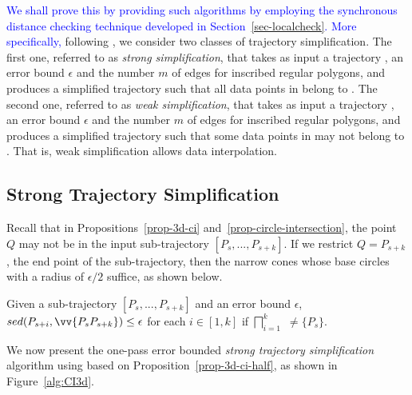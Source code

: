 \textcolor{blue}{We shall prove this by providing such algorithms by employing the synchronous distance checking technique developed in Section~\ref{sec-localcheck}.}
%
\textcolor{blue}{More specifically,} following \cite{Trajcevski:DDR,Lin:Operb}, we consider two classes of trajectory simplification.
The first one, referred to as \emph{strong simplification}, that takes as input a trajectory , an error bound $\epsilon$ and the number $m$ of edges for inscribed regular polygons, and produces a simplified trajectory  such that all data points in  belong to .
The second one, referred to as \emph{weak simplification}, that takes as input a trajectory , an error bound $\epsilon$ and the number $m$ of edges for inscribed regular polygons, and produces a simplified trajectory  such that some data points in  may not belong to . That is, weak simplification allows data interpolation.


\subsection{Strong Trajectory Simplification}




Recall that in Propositions~\ref{prop-3d-ci} and~\ref{prop-circle-intersection}, the point $Q$ may not be in the input sub-trajectory $[P_s,...,P_{s+k}]$.
If we restrict $Q=P_{s+k}$, the end point of the sub-trajectory, then the narrow cones whose base circles with a radius of $\epsilon/2$ suffice, as shown below.

\begin{prop}
\label{prop-3d-ci-half}
Given a sub-trajectory $[P_s,...,P_{s+k}]$ and an error bound $\epsilon$, $sed(P_{s+i}, \vv{P_sP_{s+k}})\le \epsilon$ for each $i \in [1,k]$ if  $\bigsqcap_{i=1}^{k}$ $\ne \{P_s\}$.
\end{prop}



 We now present the  one-pass error bounded {\em strong trajectory simplification} algorithm using \sed based on Proposition~\ref{prop-3d-ci-half}, as shown in Figure~\ref{alg:CI3d}.


